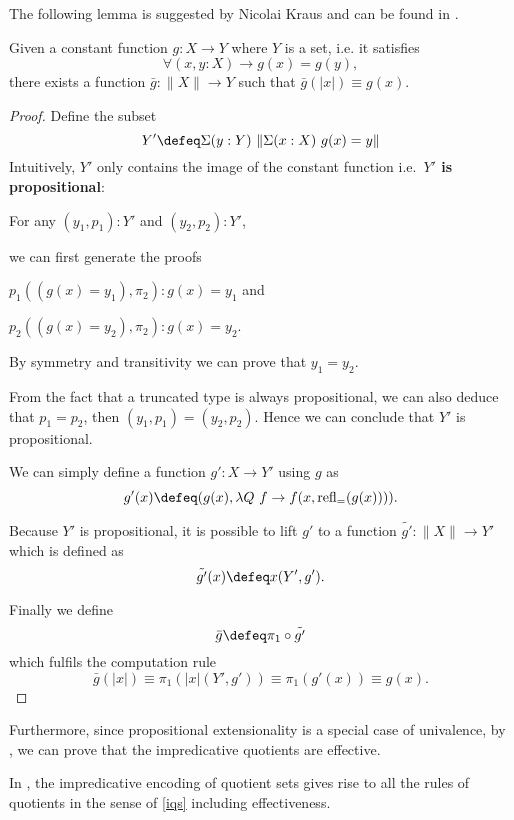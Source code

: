 The following lemma is suggested by Nicolai Kraus and can be found in
\cite{krausEscardoEtAll_existence}.

\begin{lemma}\label{constantT}
Given a constant function $g : X \to Y$ where $Y$ is a set, i.e. it satisfies
$$\forall(x,y : X) \to g(x) = g(y),$$
there exists a function $\bar{g} : \|X\| \to Y$ such that $\bar{g}(| x |) \equiv g(x)$.
\end{lemma}

\begin{proof}

Define the subset
$$Y' \defeq \Sigma (y : Y)~ \|\Sigma (x : X) ~g(x) = y \|$$
Intuitively, $Y'$ only contains the image of the constant function i.e.\ \textbf{$Y'$
is propositional}:

For any $(y_1,p_1) : Y'$ and $(y_2,p_2): Y'$, 

we can first generate the proofs 

$p_1 ((g(x) = y_1),\pi_2) : g(x) = y_1$ and 

$p_2 ((g(x) = y_2),\pi_2) : g(x) = y_2$.

By symmetry and transitivity we can prove that $y_1 = y_2$.

From the fact that a truncated type is always propositional, we can
also deduce that $p_1 = p_2$, then $(y_1,p_1) = (y_2,p_2)$. Hence we
can conclude that $Y'$ is propositional.

We can simply define a function $g' : X \to Y'$ using $g$ as
$$g'(x) \defeq (g(x), \lambda Q ~f \to f (x , \text{refl}_{=}(g(x)))).$$

Because $Y'$ is propositional, it is possible to lift $g'$ to a function $\tilde{g'} : \| X\| \to Y'$ which is defined as
$$\tilde{g'}(x) \defeq x (Y',g').$$

Finally we define
$$\bar{g} \defeq \pi_1 \circ \tilde{g'}$$
which fulfils the computation rule
$$\bar{g}(|x|) \equiv  \pi_1 (|x|(Y',g'))  \equiv \pi_1 (g' (x)) \equiv g(x).$$
\end{proof}

Furthermore, since propositional extensionality is a special case of
univalence, by , we can prove that the impredicative
quotients are effective.

\begin{theorem}
In \hott, the impredicative encoding of quotient sets gives rise to all the rules of quotients in the sense of \ref{iqs} including effectiveness.
\end{theorem}

